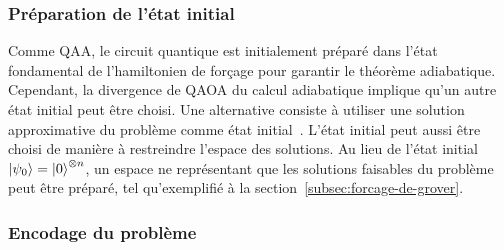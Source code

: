 
\subsubsection{Préparation de l'état initial}
\label{subsec:preparation-de-etat-initial}

Comme QAA, le circuit quantique est initialement préparé dans l'état fondamental de l'hamiltonien de forçage pour garantir le théorème adiabatique. Cependant, la divergence de QAOA du calcul adiabatique implique qu'un autre état initial peut être choisi. Une alternative consiste à utiliser une solution approximative du problème comme état initial~\cite{eggerWarmstartingQuantumOptimization2021}. L'état initial peut aussi être choisi de manière à restreindre l'espace des solutions. Au lieu de l'état initial $\ket{\psi_{0}} = \ket{0}^{\otimes n}$, un espace ne représentant que les solutions faisables du problème peut être préparé, tel qu'exemplifié à la section~\ref{subsec:forcage-de-grover}.


\subsubsection{Encodage du problème}
\label{subsec:encodage-probleme}

